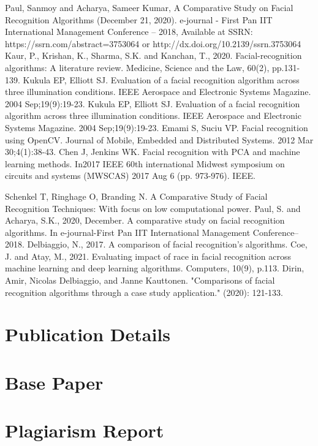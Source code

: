 \documentclass[openany]{report}
\begin{document}
\begin{thebibliography}{10}
    Paul, Sanmoy and Acharya, Sameer Kumar, A Comparative Study on Facial Recognition Algorithms (December 21, 2020). e-journal - First Pan IIT International Management Conference – 2018, Available at SSRN: https://ssrn.com/abstract=3753064 or http://dx.doi.org/10.2139/ssrn.3753064
    Kaur, P., Krishan, K., Sharma, S.K. and Kanchan, T., 2020. Facial-recognition algorithms: A literature review. Medicine, Science and the Law, 60(2), pp.131-139.
    Kukula EP, Elliott SJ. Evaluation of a facial recognition algorithm across three illumination conditions. IEEE Aerospace and Electronic Systems Magazine. 2004 Sep;19(9):19-23.
    Kukula EP, Elliott SJ. Evaluation of a facial recognition algorithm across three illumination conditions. IEEE Aerospace and Electronic Systems Magazine. 2004 Sep;19(9):19-23.
    Emami S, Suciu VP. Facial recognition using OpenCV. Journal of Mobile, Embedded and Distributed Systems. 2012 Mar 30;4(1):38-43.
    Chen J, Jenkins WK. Facial recognition with PCA and machine learning methods. In2017 IEEE 60th international Midwest symposium on circuits and systems (MWSCAS) 2017 Aug 6 (pp. 973-976). IEEE.

    Schenkel T, Ringhage O, Branding N. A Comparative Study of Facial Recognition Techniques: With focus on low computational power.
    Paul, S. and Acharya, S.K., 2020, December. A comparative study on facial recognition algorithms. In e-journal-First Pan IIT International Management Conference–2018.
    Delbiaggio, N., 2017. A comparison of facial recognition’s algorithms.
    Coe, J. and Atay, M., 2021. Evaluating impact of race in facial recognition across machine learning and deep learning algorithms. Computers, 10(9), p.113.
    Dirin, Amir, Nicolas Delbiaggio, and Janne Kauttonen. "Comparisons of facial recognition algorithms through a case study application." (2020): 121-133.

\end{thebibliography}



\appendix

\chapter{Publication Details}

\chapter{Base Paper}

\chapter{Plagiarism Report}
\end{document}
